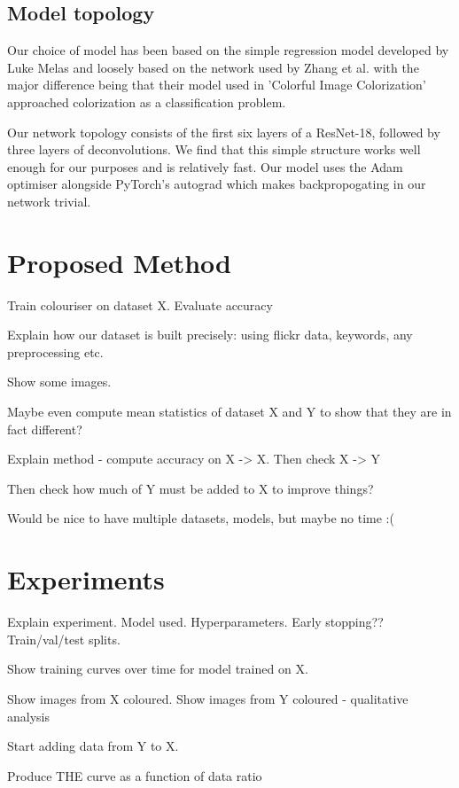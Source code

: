 \documentclass[conference]{IEEEtran}
\begin{document}
\subsection{Model topology}

Our choice of model has been based on the simple regression model developed by Luke Melas and loosely based on the network used by Zhang et al. \cite{zhang2016colorful} with the major difference being that their model used in 'Colorful Image Colorization'\cite{zhang2016colorful} approached colorization as a classification problem.

Our network topology consists of the first six layers of a ResNet-18, followed by three layers of deconvolutions. We find that this simple structure works well enough for our purposes and is relatively fast. Our model uses the Adam optimiser alongside PyTorch's autograd which makes backpropogating in our network trivial.

\section{Proposed Method}

Train colouriser on dataset X. Evaluate accuracy

Explain how our dataset is built precisely: using flickr data, keywords, any preprocessing etc. 

Show some images. 

Maybe even compute mean statistics of dataset X and Y to show that they are in fact different?

Explain method - compute accuracy on X -> X.
Then check X -> Y

Then check how much of Y must be added to X to improve things?

Would be nice to have multiple datasets, models, but maybe no time :(

\section{Experiments}

Explain experiment. Model used. Hyperparameters. Early stopping?? Train/val/test splits.

Show training curves over time for model trained on X. 

Show images from X coloured.
Show images from Y coloured - qualitative analysis

Start adding data from Y to X. 

Produce THE curve as a function of data ratio
\end{document}
